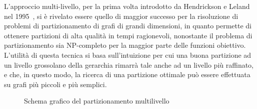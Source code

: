 L'approccio multi-livello, per la prima volta introdotto da Hendrickson e Leland nel
1995~\cite{Hendrickson:1995:MPG:221253.221279}, si \`e rivelato essere quello di maggior successo per la risoluzione
di problemi di partizionamento di grafi di grandi dimensioni, in quanto permette di ottenere partizioni di alta
qualit\`a in tempi ragionevoli, nonostante il problema di partizionamento sia NP-completo per la maggior parte delle
funzioni obiettivo. \newline
L'utilit\`a di questa tecnica si basa sull'intuizione per cui una buona partizione ad un livello grossolano della
gerarchia rimarr\`a tale anche ad un livello pi\`u raffinato, e che, in questo modo, la ricerca di una
partizione ottimale pu\`o essere effettuata su grafi pi\`u piccoli e pi\`u semplici. \newline

\begin{figure}[h!]
    \centering
    
    \caption{Schema grafico del partizionamento multilivello}
    \label{fig:multi-level-graph-partitioning}
\end{figure}

